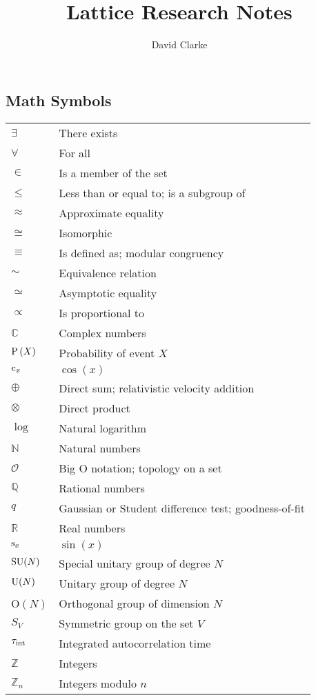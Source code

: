 \documentclass[12pt]{book}
\title{\bf Lattice Research Notes}
\author{David Clarke}
\theoremstyle{definition}
\newenvironment{frontstuff}
  {\centering\chapter*{}}
  {\clearpage}
\begin{document}
\frontmatter                            %
\maketitle                              %

\begin{frontstuff} %

\section*{Math Symbols}
\begin{tabular}{ll}
$\exists$       & There exists \\
$\forall$       & For all \\
$\in$           & Is a member of the set \\
$\leq$          & Less than or equal to; is a subgroup of\\
$\approx$       & Approximate equality \\
$\cong$         & Isomorphic\\
$\equiv$        & Is defined as; modular congruency \\
$\sim$          & Equivalence relation \\
$\simeq$        & Asymptotic equality \\
$\propto$       & Is proportional to \\
$\mathbb{C}$    & Complex numbers \\
$\operatorname{P}\left(X\right)$        & Probability of event $X$ \\
$\operatorname{c}_x$         & $\cos(x)$ \\
$\oplus$        & Direct sum; relativistic velocity addition  \\
$\otimes$       & Direct product \\ 
$\log$          & Natural logarithm \\
$\mathbb{N}$    & Natural numbers \\
$\mathcal{O}$   & Big O notation; topology on a set \\ 
$\mathbb{Q}$    & Rational numbers \\
$q$             & Gaussian or Student difference test; goodness-of-fit \\
$\mathbb{R}$    & Real numbers \\
$\operatorname{s}_x$          & $\sin(x)$ \\
$\operatorname{SU}(N)$        & Special unitary group of degree $N$ \\
$\operatorname{U}(N)$         & Unitary group of degree $N$ \\
O$(N)$         & Orthogonal group of dimension $N$ \\
$S_V$           & Symmetric group on the set $V$ \\
$\tau_\text{int}$       & Integrated autocorrelation time \\
$\mathbb{Z}$    & Integers \\
$\mathbb{Z}_n$  & Integers modulo $n$ \\
\end{tabular}
\clearpage


\end{frontstuff}
\end{document}
